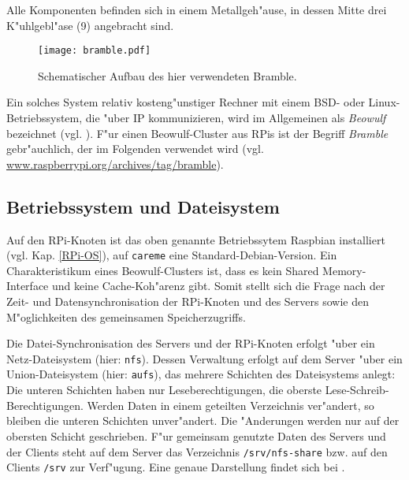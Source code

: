 Alle Komponenten befinden sich in einem Metallgeh"ause, in dessen Mitte drei K"uhlgebl"ase (9) angebracht sind. 
\begin{figure}[htb]
	\centering
	\texttt{[image: bramble.pdf]}\\ 
	\caption{Schematischer Aufbau des hier verwendeten Bramble.}\label{fig:Bramble}
\end{figure}
Ein solches System relativ kosteng"unstiger Rechner mit einem BSD- oder Linux-Betriebs\-system, die "uber IP kommunizieren, wird im Allgemeinen als \textit{Beowulf} bezeichnet (vgl. \cite{kie01}). F"ur einen Beowulf-Cluster aus RPis ist der Begriff \textit{Bramble} gebr"auchlich, der im Folgenden verwendet wird (vgl. \url{www.raspberrypi.org/archives/tag/bramble}). 
 
\subsection{Betriebssystem und Dateisystem}\label{Bramble-Architektur} 

Auf den RPi-Knoten ist das oben genannte Betriebssytem Raspbian installiert (vgl. Kap. \ref{RPi-OS}), auf \texttt{careme} eine Standard-Debian-Version. Ein Charakteristikum eines Beowulf-Clusters ist, dass es kein Shared Memory-Interface und keine Cache-Koh"arenz gibt. Somit stellt sich die Frage nach der Zeit- und Datensynchronisation der RPi-Knoten und des Servers sowie den M"oglichkeiten des gemeinsamen Speicherzugriffs. 

\noindent
Die Datei-Synchronisation des Servers und der RPi-Knoten erfolgt "uber ein Netz-Dateisys\-tem (hier: \texttt{nfs}). Dessen Verwaltung erfolgt auf dem Server "uber ein Union-Dateisystem (hier: \texttt{aufs}), das mehrere Schichten des Dateisystems anlegt: Die unteren Schichten haben nur Leseberechtigungen, die oberste Lese-Schreib-Berechtigungen. Werden Daten in einem geteilten Verzeichnis ver"andert, so bleiben die unteren Schichten unver"andert. Die "Anderungen werden nur auf der obersten Schicht geschrieben. F"ur gemeinsam genutzte Daten des Servers und der Clients steht auf dem Server das Verzeichnis \texttt{/srv/nfs-share} bzw. auf den Clients \texttt{/srv} zur Verf"ugung. Eine genaue Darstellung findet sich bei \cite{kli13}.

